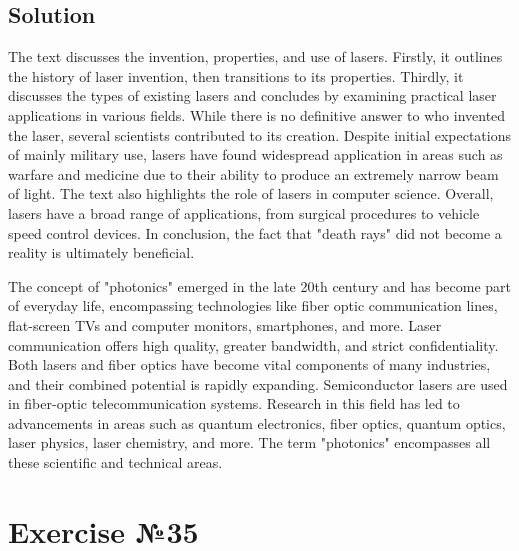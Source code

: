 \subsection*{Solution}
The text discusses the invention, properties, and use of lasers. Firstly, it outlines
the history of laser invention, then transitions to its properties. Thirdly, it
discusses the types of existing lasers and concludes by examining practical laser
applications in various fields. While there is no definitive answer to who invented
the laser, several scientists contributed to its creation. Despite initial expectations
of mainly military use, lasers have found widespread application in areas such as
warfare and medicine due to their ability to produce an extremely narrow beam of
light. The text also highlights the role of lasers in computer science. Overall,
lasers have a broad range of applications, from surgical procedures to vehicle speed
control devices. In conclusion, the fact that "death rays" did not become a reality
is ultimately beneficial.

The concept of "photonics" emerged in the late 20th century and has become part of
everyday life, encompassing technologies like fiber optic communication lines,
flat-screen TVs and computer monitors, smartphones, and more. Laser communication
offers high quality, greater bandwidth, and strict confidentiality. Both lasers and
fiber optics have become vital components of many industries, and their combined
potential is rapidly expanding. Semiconductor lasers are used in fiber-optic
telecommunication systems. Research in this field has led to advancements in areas
such as quantum electronics, fiber optics, quantum optics, laser physics, laser
chemistry, and more. The term "photonics" encompasses all these scientific and
technical areas.

\section{Exercise №35}
